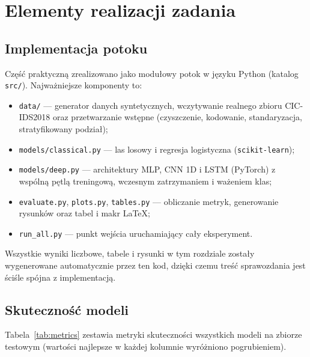 \section{Elementy realizacji zadania}
\label{sec:realizacja}

\subsection{Implementacja potoku}

Część praktyczną zrealizowano jako modułowy potok w języku Python (katalog
\texttt{src/}). Najważniejsze komponenty to:
\begin{itemize}
  \item \texttt{data/} --- generator danych syntetycznych, wczytywanie realnego
        zbioru CIC-IDS2018 oraz przetwarzanie wstępne (czyszczenie, kodowanie,
        standaryzacja, stratyfikowany podział);
  \item \texttt{models/classical.py} --- las losowy i regresja logistyczna
        (\texttt{scikit-learn});
  \item \texttt{models/deep.py} --- architektury MLP, CNN 1D i LSTM (PyTorch) z
        wspólną pętlą treningową, wczesnym zatrzymaniem i ważeniem klas;
  \item \texttt{evaluate.py}, \texttt{plots.py}, \texttt{tables.py} --- obliczanie
        metryk, generowanie rysunków oraz tabel i makr \LaTeX;
  \item \texttt{run\_all.py} --- punkt wejścia uruchamiający cały eksperyment.
\end{itemize}
Wszystkie wyniki liczbowe, tabele i rysunki w tym rozdziale zostały
wygenerowane automatycznie przez ten kod, dzięki czemu treść sprawozdania jest
ściśle spójna z implementacją.

\subsection{Skuteczność modeli}

Tabela~\ref{tab:metrics} zestawia metryki skuteczności wszystkich modeli na
zbiorze testowym (wartości najlepsze w każdej kolumnie wyróżniono pogrubieniem).

\begin{table}[H]
\centering
\caption{Porównanie skuteczności modeli na zbiorze testowym.}
\label{tab:metrics}
\small

\end{table}

